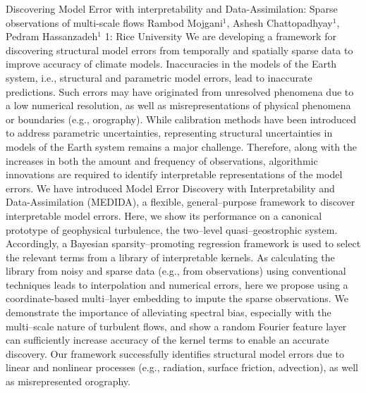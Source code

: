 \vspace{1.5ex}
\abs
{Discovering Model Error with interpretability and Data-Assimilation: Sparse observations of multi-scale flows}
{Rambod Mojgani$^{1}$, Ashesh Chattopadhyay$^{1}$, Pedram Hassanzadeh$^{1}$}
{1: Rice University}
{We are developing a framework for discovering structural model errors from temporally and spatially sparse data to improve accuracy of climate models. Inaccuracies in the models of the Earth system, i.e., structural and parametric model errors, lead to inaccurate predictions. Such errors may have originated from unresolved phenomena due to a low numerical resolution, as well as misrepresentations of physical phenomena or boundaries (e.g., orography). While calibration methods have been introduced to address parametric uncertainties, representing structural uncertainties in models of the Earth system remains a major challenge. Therefore, along with the increases in both the amount and frequency of observations, algorithmic innovations are required to identify interpretable representations of the model errors. We have introduced Model Error Discovery with Interpretability and Data-Assimilation (MEDIDA), a flexible, general--purpose framework to discover interpretable model errors. Here, we show its performance on a canonical prototype of geophysical turbulence, the two--level quasi--geostrophic system. Accordingly, a Bayesian sparsity--promoting regression framework is used to select the relevant terms from a library of interpretable kernels. As calculating the library from noisy and sparse data (e.g., from observations) using conventional techniques leads to interpolation and numerical errors, here we propose using a coordinate-based multi--layer embedding to impute the sparse observations. We demonstrate the importance of alleviating spectral bias, especially with the multi--scale nature of turbulent flows, and show a random Fourier feature layer can sufficiently increase accuracy of the kernel terms to enable an accurate discovery. Our framework successfully identifies structural model errors due to linear and nonlinear processes (e.g., radiation, surface friction, advection), as well as misrepresented orography.}


